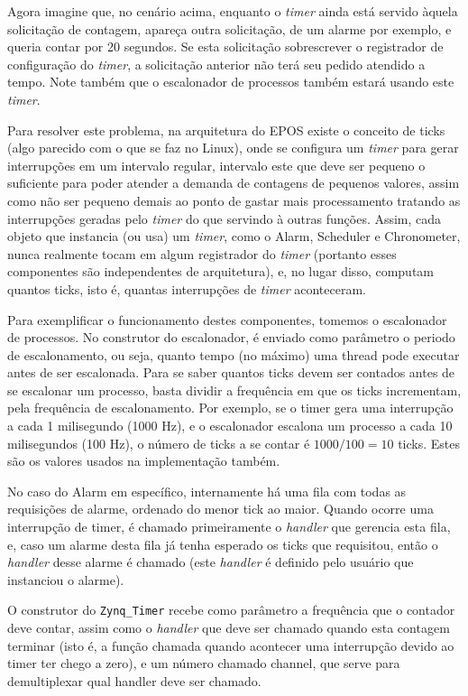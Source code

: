\documentclass{ufscThesis/ufscThesis} %
\begin{document}
Agora imagine que, no cenário acima, enquanto o \emph{timer} ainda está servido àquela solicitação de contagem, apareça outra solicitação, de um alarme por exemplo, e queria contar por 20 segundos. Se esta solicitação sobrescrever o registrador de configuração do \emph{timer}, a solicitação anterior não terá seu pedido atendido a tempo. Note também que o escalonador de processos também estará usando este \emph{timer}.

Para resolver este problema, na arquitetura do EPOS existe o conceito de ticks (algo parecido com o que se faz no Linux), onde se configura um \emph{timer} para gerar interrupções em um intervalo regular, intervalo este que deve ser pequeno o suficiente para poder atender a demanda de contagens de pequenos valores, assim como não ser pequeno demais ao ponto de gastar mais processamento tratando as interrupções geradas pelo \emph{timer} do que servindo à outras funções. Assim, cada objeto que instancia (ou usa) um \emph{timer}, como o Alarm, Scheduler e Chronometer, nunca realmente tocam em algum registrador do \emph{timer} (portanto esses componentes são independentes de arquitetura), e, no lugar disso, computam quantos ticks, isto é, quantas interrupções de \emph{timer} aconteceram.

Para exemplificar o funcionamento destes componentes, tomemos o escalonador de processos. No construtor do escalonador, é enviado como parâmetro o periodo de escalonamento, ou seja, quanto tempo (no máximo) uma thread pode executar antes de ser escalonada. Para se saber quantos ticks devem ser contados antes de se escalonar um processo, basta dividir a frequência em que os ticks incrementam, pela frequência de escalonamento. Por exemplo, se o timer gera uma interrupção a cada 1 milisegundo (1000 Hz), e o escalonador escalona um processo a cada 10 milisegundos (100 Hz), o número de ticks a se contar é $1000/100 = 10$ ticks. Estes são os valores usados na implementação também.

No caso do Alarm em específico, internamente há uma fila com todas as requisições de alarme, ordenado do menor tick ao maior. Quando ocorre uma interrupção de timer, é chamado primeiramente o \emph{handler} que gerencia esta fila, e, caso um alarme desta fila já tenha esperado os ticks que requisitou, então o \emph{handler} desse alarme é chamado (este \emph{handler} é definido pelo usuário que instanciou o alarme).


O construtor do \verb+Zynq_Timer+ recebe como parâmetro a frequência que o contador deve contar, assim como o \emph{handler} que deve ser chamado quando esta contagem terminar (isto é, a função chamada quando acontecer uma interrupção devido ao timer ter chego a zero), e um número chamado channel, que serve para demultiplexar qual handler deve ser chamado.
\end{document}
